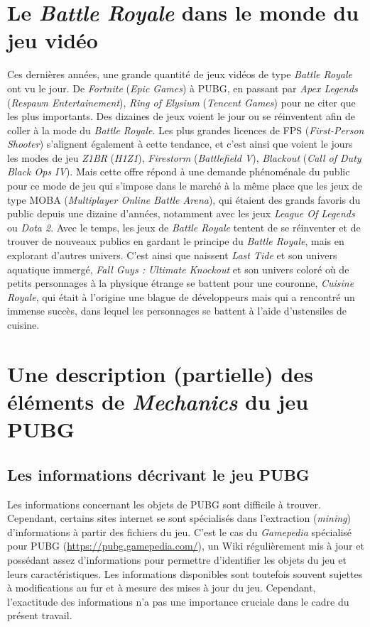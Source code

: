\section{Le \emph{Battle Royale} dans le monde du jeu vidéo}
Ces dernières années, une grande quantité de jeux vid\'eos de type \emph{Battle Royale} ont vu le jour. De \emph{Fortnite} (\emph{Epic Games}) à PUBG, en passant par \emph{Apex Legends} (\emph{Respawn Entertainement}), \emph{Ring of Elysium} (\emph{Tencent Games}) pour ne citer que les plus importants. Des dizaines de jeux voient le jour ou se réinventent afin de coller à la mode du \emph{Battle Royale}. Les plus grandes licences de FPS (\emph{First-Person Shooter}) s'alignent également à cette tendance, et c'est ainsi que voient le jours les modes de jeu \emph{Z1BR} (\emph{H1Z1}), \emph{Firestorm} (\emph{Battlefield V}), \emph{Blackout} (\emph{Call of Duty Black Ops IV}). Mais cette offre répond à une demande phénoménale du public pour ce mode de jeu qui s'impose dans le marché à la même place que les jeux de type MOBA (\emph{Multiplayer Online Battle Arena}), qui étaient des grands favoris du public depuis une dizaine d'années, notamment avec les jeux \emph{League Of Legends} ou \emph{Dota 2}. Avec le temps, les jeux de \emph{Battle Royale} tentent de se réinventer et de trouver de nouveaux publics en gardant le principe du \emph{Battle Royale}, mais en explorant d'autres univers. C'est ainsi que naissent \emph{Last Tide} et son univers aquatique immergé, \emph{Fall Guys : Ultimate Knockout} et son univers coloré où de petits personnages à la physique étrange se battent pour une couronne, \emph{Cuisine Royale}, qui était à l'origine une blague de développeurs mais qui a rencontré un immense succès, dans lequel les personnages se battent à l'aide d'ustensiles de cuisine.

\section{Une description (partielle) des \'el\'ements de \emph{Mechanics} du jeu PUBG}
\subsection{Les informations d\'ecrivant le jeu PUBG}
Les informations concernant les objets de PUBG sont difficile à trouver.
Cependant, certains sites internet se sont spécialisés dans l'extraction (\emph{mining}) d'informations à partir des fichiers du jeu.
C'est le cas du \emph{Gamepedia} spécialisé pour PUBG (\url{https://pubg.gamepedia.com/}),
un Wiki régulièrement mis à jour et possédant assez d'informations pour permettre d'identifier les objets du jeu et leurs caractéristiques.
Les informations disponibles sont toutefois souvent sujettes à modifications au fur et à mesure des mises à jour du jeu.
Cependant, l'exactitude des informations n'a pas une importance cruciale dans le cadre du pr\'esent travail.


